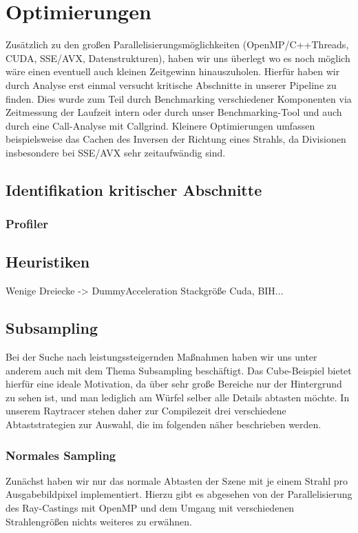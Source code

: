 \section{Optimierungen}
Zusätzlich zu den großen Parallelisierungsmöglichkeiten (OpenMP/C++Threads, CUDA, SSE/AVX, Datenstrukturen), haben wir uns überlegt wo es noch möglich wäre einen eventuell auch kleinen Zeitgewinn hinauszuholen.
Hierfür haben wir durch Analyse erst einmal versucht kritische Abschnitte in unserer Pipeline zu finden.
Dies wurde zum Teil durch Benchmarking verschiedener Komponenten via Zeitmessung der Laufzeit intern oder durch unser Benchmarking-Tool und auch durch eine Call-Analyse mit Callgrind.
Kleinere Optimierungen umfassen beispielsweise das Cachen des Inversen der Richtung eines Strahls, da Divisionen insbesondere bei SSE/AVX sehr zeitaufwändig sind.

\subsection{Identifikation kritischer Abschnitte}
\subsubsection{Profiler}
\label{ssec:crit-profiler}

\subsection{Heuristiken}
Wenige Dreiecke -> DummyAcceleration
Stackgröße Cuda, BIH...

\subsection{Subsampling}
Bei der Suche nach leistungssteigernden Maßnahmen haben wir uns unter anderem auch mit dem Thema Subsampling beschäftigt.
Das Cube-Beispiel bietet hierfür eine ideale Motivation, da über sehr große Bereiche nur der Hintergrund zu sehen ist, und man lediglich am Würfel selber alle Details abtasten möchte.
In unserem Raytracer stehen daher zur Compilezeit drei verschiedene Abtaststrategien zur Auswahl, die im folgenden näher beschrieben werden.

\subsubsection{Normales Sampling}
Zunächst haben wir nur das normale Abtasten der Szene mit je einem Strahl pro Ausgabebildpixel implementiert.
Hierzu gibt es abgesehen von der Parallelisierung des Ray-Castings mit OpenMP und dem Umgang mit verschiedenen Strahlengrößen nichts weiteres zu erwähnen.

